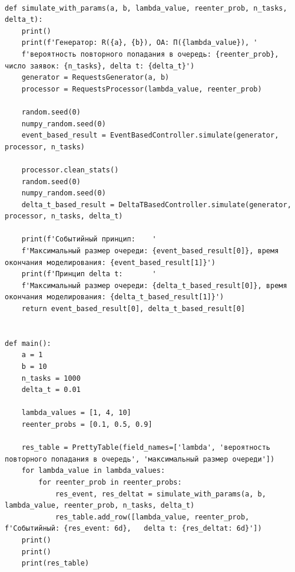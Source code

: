 \documentclass[14pt, a4paper]{extarticle}
\begin{document}
\begin{lstlisting}[caption = {Код участка программы, с помощью которого проводилось исследование}, label=lst:list3]

def simulate_with_params(a, b, lambda_value, reenter_prob, n_tasks, delta_t):
	print()
	print(f'Генератор: R({a}, {b}), ОА: П({lambda_value}), '
	f'вероятность повторного попадания в очередь: {reenter_prob}, число заявок: {n_tasks}, delta t: {delta_t}')
	generator = RequestsGenerator(a, b)
	processor = RequestsProcessor(lambda_value, reenter_prob)
	
	random.seed(0)
	numpy_random.seed(0)
	event_based_result = EventBasedController.simulate(generator, processor, n_tasks)
	
	processor.clean_stats()
	random.seed(0)
	numpy_random.seed(0)
	delta_t_based_result = DeltaTBasedController.simulate(generator, processor, n_tasks, delta_t)
	
	print(f'Событийный принцип:    '
	f'Максимальный размер очереди: {event_based_result[0]}, время окончания моделирования: {event_based_result[1]}')
	print(f'Принцип delta t:       '
	f'Максимальный размер очереди: {delta_t_based_result[0]}, время окончания моделирования: {delta_t_based_result[1]}')
	return event_based_result[0], delta_t_based_result[0]


def main():
	a = 1
	b = 10
	n_tasks = 1000
	delta_t = 0.01
	
	lambda_values = [1, 4, 10]
	reenter_probs = [0.1, 0.5, 0.9]
	
	res_table = PrettyTable(field_names=['lambda', 'вероятность повторного попадания в очередь', 'максимальный размер очереди'])
	for lambda_value in lambda_values:
		for reenter_prob in reenter_probs:
			res_event, res_deltat = simulate_with_params(a, b, lambda_value, reenter_prob, n_tasks, delta_t)
			res_table.add_row([lambda_value, reenter_prob, f'Событийный: {res_event: 6d},   delta t: {res_deltat: 6d}'])
	print()
	print()
	print(res_table)
\end{lstlisting}
\end{document}
